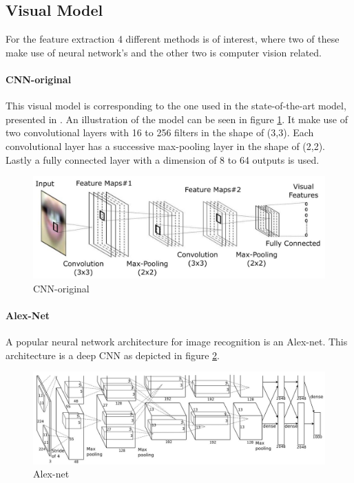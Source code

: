 \subsection{Visual Model}
For the feature extraction 4 different methods is of interest, where two of these make use of neural network's and the other two is computer vision related.
\paragraph{CNN-original}
This visual model is corresponding to the one used in the state-of-the-art model, presented in \cite{Lee}.
An illustration of the model can be seen in figure \ref{fig:cnnOriginal}.
It make use of two convolutional layers with 16 to 256 filters in the shape of (3,3).
Each convolutional layer has a successive max-pooling layer in the shape of (2,2).
Lastly a fully connected layer with a dimension of 8 to 64 outputs is used.
\begin{figure}[h]
    \centering
    \includegraphics[width=\columnwidth]{fig/cnnOriginal.jpg}
    \caption{CNN-original\cite{Lee}}
    \label{fig:cnnOriginal}
\end{figure}

\paragraph{Alex-Net}
A popular neural network architecture for image recognition is an Alex-net\cite{Krizhevsky2012}.
This architecture is a deep CNN as depicted in figure \ref{fig:alexNet}.
\begin{figure}[h]
    \centering
    \includegraphics[width=\columnwidth]{fig/alexNet.jpg}
    \caption{Alex-net\cite{Krizhevsky2012}}
    \label{fig:alexNet}
\end{figure}

